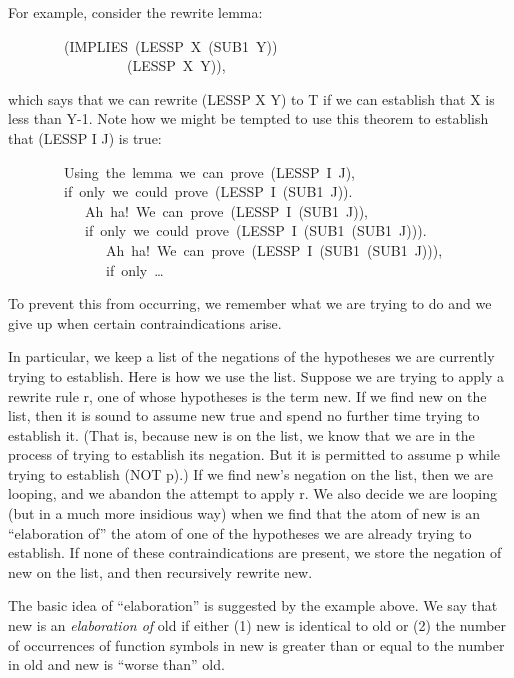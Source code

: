 \documentclass[11pt]{book}
\newenvironment{pubasis}{\begin{flushleft}\ttfamily\small}{\normalsize\rmfamily\end{flushleft}}
\newcommand{\pubinlineunderline}[1]{\emph{#1}}
\begin{document}
For example, consider the rewrite lemma:
\begin{pubasis}
~~~~~~~~(IMPLIES~(LESSP~X~(SUB1~Y))\\
~~~~~~~~~~~~~~~~~(LESSP~X~Y)),\\
\end{pubasis}
which says that we can rewrite (LESSP X Y) to T if we can establish
that X is less than Y-1.  Note how we might be tempted to
use this theorem to establish that (LESSP I J) is true:
\begin{pubasis}
~~~~~~~~Using~the~lemma~we~can~prove~(LESSP~I~J),\\
~~~~~~~~if~only~we~could~prove~(LESSP~I~(SUB1~J)).\\

~~~~~~~~~~~Ah~ha!~We~can~prove~(LESSP~I~(SUB1~J)),\\
~~~~~~~~~~~if~only~we~could~prove~(LESSP~I~(SUB1~(SUB1~J))).\\

~~~~~~~~~~~~~~Ah~ha!~We~can~prove~(LESSP~I~(SUB1~(SUB1~J))),\\
~~~~~~~~~~~~~~if~only~\ldots{}\\
\end{pubasis}
To prevent this from occurring, we
remember what we are trying to do and we give up when certain contraindications
arise.

In particular, we keep a list of the
negations of the hypotheses we are currently trying to establish.
Here is how we use the list.  Suppose we are trying to apply a rewrite
rule r, one of whose hypotheses is the term new.
If we find new on the list, then it is sound to assume new
true and spend no further time trying to establish it.  (That is,
because new is on the list, we know that we are in the process of trying to
establish its negation.  But it is permitted to assume p while trying
to establish (NOT p).)  If we find
new's negation on the list, then we are looping, and we abandon the attempt
to apply r.
We also decide we are looping (but in a much more insidious way)
when we find that the atom of new is an ``elaboration of''
the atom of  one of the hypotheses we are
already trying to establish.  If none of these contraindications are present, we
store the negation of new  on the list, and then recursively rewrite new.

The basic idea of ``elaboration'' is suggested by the example
above.  We say that new is an \pubinlineunderline{elaboration of} old
if either (1) new is identical to old or (2) the
number of occurrences of function symbols in new is greater than
or equal to the number in old and new is ``worse than'' old.
\end{document}
